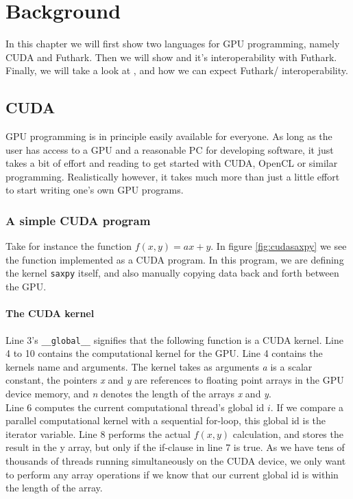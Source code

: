 \chapter{Background}
In this chapter we will first show two languages for GPU programming, namely
CUDA and Futhark. Then we will show \csharp{} and it's interoperability with
Futhark.
Finally, we will take a look at \fsharp{}, and how we can expect
Futhark/\fsharp{} interoperability.

\section{CUDA}
GPU programming is in principle easily available for everyone. As long as the user has access
to a GPU and a reasonable PC for developing software, it just takes a bit of effort and reading to get started with CUDA, OpenCL or similar programming.
Realistically however, it takes much more than just a little effort to start
writing one's own GPU programs. 

\subsection{A simple CUDA program}
Take for instance the function $f(x,y) = ax+y$. In figure \ref{fig:cudasaxpy} we see the
function implemented as a CUDA program. In this program, we are defining the
kernel \texttt{saxpy} itself, and also manually copying data back and forth
between the GPU.

\subsubsection{The CUDA kernel}
Line 3's \texttt{\_\_global\_\_} signifies that the following function is a CUDA kernel.
Line 4 to 10 contains the computational kernel for the GPU.
Line 4 contains the kernels name and arguments. The kernel takes as arguments
\textit{a} is a scalar constant, the pointers \textit{x} and \textit{y} are
references to floating point arrays in the GPU device memory, and \textit{n}
denotes the length of the arrays \textit{x} and \textit{y}.\\
Line 6 computes the current computational thread's global id $i$. If we compare
a parallel computational kernel with a sequential for-loop, this global id is
the iterator variable.
Line 8 performs the actual $f(x,y)$ calculation, and stores the result in the y
array, but only if the if-clause in line 7 is true.
As we have tens of thousands of threads running simultaneously on the CUDA
device, we only want to perform any array operations if we know that our current
global id is within the length of the array.
\\\\

